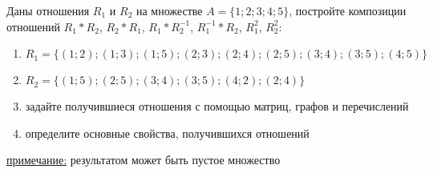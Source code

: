 \question
Даны отношения $R_1$ и $R_2$ на множестве $A = \{1; 2; 3; 4; 5\}$, постройте композиции отношений $R_1*R_2$, $R_2*R_1$, $R_1*R_2^{-1}$, $R_1^{-1}*R_2$, $R_1^2$, $R_2^2$:
\begin{enumerate}
	\renewcommand{\labelenumi}{\alph{enumi})}
	\item $R_1 = \{(1; 2); (1; 3); (1; 5); (2; 3); (2; 4); (2; 5); (3; 4); (3; 5); (4; 5)\}$
	\item $R_2 = \{(1; 5); (2; 5); (3; 4); (3; 5); (4; 2); (2; 4)\}$
	\item задайте получившиеся отношения с помощью матриц, графов и перечислений 
	\item определите основные свойства, получившихся отношений
\end{enumerate}

\underline{примечание:} результатом может быть пустое множество
